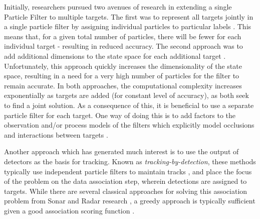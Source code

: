 Initially, researchers pursued two avenues of research in extending a single Particle Filter to multiple targets. The first was to represent all targets jointly in a single particle filter by assigning individual particles to particular labels \cite{MultiMixtureTracking03}. This means that, for a given total number of particles, there will be fewer for each individual target - resulting in reduced accuracy. The second approach was to add additional dimensions to the state space for each additional target \cite{TrackMultTargets01}. Unfortunately, this approach quickly increases the dimensionality of the state space, resulting in a need for a very high number of particles for the filter to remain accurate. In both approaches, the computational complexity increases exponentially as targets are added (for constant level of accuracy), as both seek to find a joint solution. As a consequence of this, it is beneficial to use a separate particle filter for each target. One way of doing this is to add factors to the observation and/or process models of the filters which explicitly model occlusions and interactions between targets \cite{MCMCParteFilt_05, ApproxMultiTrack_06}. 

Another approach which has generated much interest is to use the output of detectors as the basis for tracking. Known as \emph{tracking-by-detection}, these methods typically use independent particle filters to maintain tracks \cite{RobustVTMT_06,MultipersonTBD_011}, and place the focus of the problem on the data association step, wherein detections are assigned to targets. While there are several classical approaches for solving this association problem from Sonar and Radar research \cite{SonarMultiTrack_83,MultiTrack_79}, a greedy approach is typically sufficient given a good association scoring function \cite{DetTrackMultiHumans_07,MultipersonTBD_011}. 


